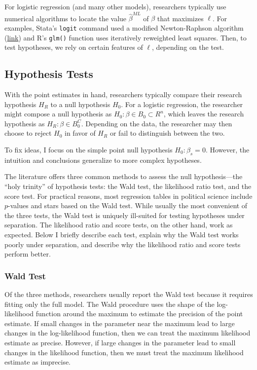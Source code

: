 \documentclass[
]{article}
\begin{document}
For logistic regression (and many other models), researchers typically
use numerical algorithms to locate the value \(\hat{\beta}^{ML}\) of
\(\beta\) that maximizes \(\ell\). For examples, Stata's \texttt{logit}
command used a modified Newton-Raphson algorithm
(\href{https://www.stata.com/help.cgi?maximize\#GPP2010}{link}) and R's
\texttt{glm()} function uses iteratively reweighted least squares. Then,
to test hypotheses, we rely on certain features of \(\ell\), depending
on the test.

\hypertarget{hypothesis-tests}{%
\subsection{Hypothesis Tests}\label{hypothesis-tests}}

With the point estimates in hand, researchers typically compare their
research hypothesis \(H_R\) to a null hypothesis \(H_0\). For a logistic
regression, the researcher might compose a null hypothesis as
\(H_0: \beta \in B_0 \subset R^n\), which leaves the research hypothesis
as \(H_R: \beta \in B_0^C\). Depending on the data, the researcher may
then choose to reject \(H_0\) in favor of \(H_R\) or fail to distinguish
between the two.

To fix ideas, I focus on the simple point null hypothesis
\(H_0: \beta_s = 0\). However, the intuition and conclusions generalize
to more complex hypotheses.

The literature offers three common methods to assess the null
hypothesis---the ``holy trinity'' of hypothesis tests: the Wald test,
the likelihood ratio test, and the score test. For practical reasons,
most regression tables in political science include \(p\)-values and
stars based on the Wald test. While usually the most convenient of the
three tests, the Wald test is uniquely ill-suited for testing hypotheses
under separation. The likelihood ratio and score tests, on the other
hand, work as expected. Below I briefly describe each test, explain why
the Wald test works poorly under separation, and describe why the
likelihood ratio and score tests perform better.

\hypertarget{wald-test}{%
\subsubsection{Wald Test}\label{wald-test}}

Of the three methods, researchers usually report the Wald test because
it requires fitting only the full model. The Wald procedure uses the
shape of the log-likelihood function around the maximum to estimate the
precision of the point estimate. If small changes in the parameter near
the maximum lead to large changes in the log-likelihood function, then
we can treat the maximum likelihood estimate as precise. However, if
large changes in the parameter lead to small changes in the likelihood
function, then we must treat the maximum likelihood estimate as
imprecise.
\end{document}
